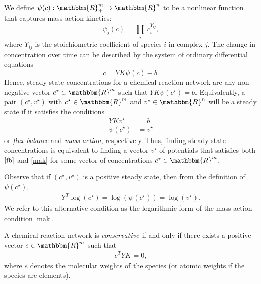 \documentclass[smallextended]{svjour3}       %
\newcommand*{\0}{\mathbf{0}}
\newcommand*{\1}{\mathbf{1}}
\newcommand*{\R}{\mathbbm{R}}
\begin{document}
We define $\psi(c):\R^m_+\rightarrow \R^n$ to be a nonlinear function that
captures mass-action kinetics:
\[
\psi_j(c) = \prod_i\,c_i^{Y_{ij}},
\]
where $Y_{ij}$ is the stoichiometric coefficient of species $i$ in complex $j$.
The change in concentration over time can be described by the system of
ordinary differential equations 
\[
\dot{c} = YK\psi(c) - b.
\] 
\noindent Hence, steady state concentrations for a chemical reaction network
are any non-negative vector $c^\star\in\R^m$ such that $YK\psi(c^\star)=b$.
Equivalently, a pair $(c^\star,v^\star)$ with $c^\star\in\R^m$ and
$v^\star\in\R^n$ will be a steady state if it satisfies the conditions
\begin{align} 
  YKv^\star &=b \label{fb}\tag{FB} \\ \psi(c^\star) &= v^\star
  \label{mak}\tag{MA} 
\end{align}
or \emph{flux-balance} and \emph{mass-action}, respectively. Thus, finding 
steady state concentrations is equivalent to finding a vector $v^\star$ of potentials
that satisfies both $\eqref{fb}$ and \eqref{mak} for some vector of concentrations 
$c^\star\in\R^m$.

Observe that if $(c^\star,v^\star)$ is a positive steady state, then from the
definition of $\psi(c^\star)$,
\begin{align}
  Y^T\log(c^\star)= \log(\psi(c^\star))= \log(v^\star).
  \label{mak-alt}
	\tag{MA-log}
\end{align} 
We refer to this alternative condition as the logarithmic form of the
mass-action condition \eqref{mak}. 

\begin{defn}
	A chemical reaction network is $\emph{conservative}$ if and only if there
	exists a positive vector $e\in\R^m$ such that 
	\begin{align}
	 e^TYK=0,
	  \label{consis}
	\end{align}
	where $e$ denotes the molecular weights of the species (or atomic weights if
	the species are elements).  
\end{defn}

\end{document}
